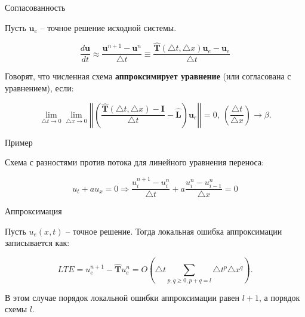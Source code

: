\documentclass[10pt,xcolor=pst,aspectratio=169]{beamer}
\begin{document}
\begin{frame}{Согласованность}

    \transdissolve[duration=0.1]
    \justifying
    \large

    Пусть $\textbf{u}_{e}$ -- точное решение исходной системы.

    \[
        \frac{d \textbf{u}}{d t} \approx \frac{\textbf{u}^{n + 1} - \textbf{u}^{n}}{\triangle t} \equiv \frac{\hat{\textbf{T}} (\triangle t, \triangle x) \textbf{u}_{e} - \textbf{u}_{e}}{\triangle t}
    \]

    Говорят, что численная схема \textbf{аппроксимирует уравнение} (или согласована с уравнением), если:

    \[
        \lim_{\triangle t \rightarrow 0} \lim_{\triangle x \rightarrow 0} \left| \left| \left( \frac{\hat{\textbf{T}} (\triangle t, \triangle x) - \textbf{I}}{\triangle t} - \hat{\textbf{L}} \right) \textbf{u}_{e} \right| \right| = 0, \: \left( \frac{\triangle t}{\triangle x} \right) \rightarrow \beta.
    \]


\end{frame}

\begin{frame}{Пример}

    \transdissolve[duration=0.1]
    \justifying
    \large

    Схема с разностями против потока для линейного уравнения переноса:

    \[
        u_{t} + a u_{x} = 0 \Rightarrow \frac{u^{n + 1}_{i} - u^{n}_{i}}{\triangle t} + a \frac{u^{n}_{i} - u^{n}_{i - 1}}{\triangle x} = 0
    \]

    

\end{frame}

\begin{frame}{Аппроксимация}

	\transdissolve[duration=0.1]
	\justifying
	\large

	Пусть $u_{e} (x, t)$ -- точное решение. Тогда локальная ошибка аппроксимации записывается как:

	\[
		LTE = u^{n + 1}_{e} - \hat{\textbf{T}} u^{n}_{e} = O \left( \triangle t \sum_{p , q \geq 0, p + q = l} \triangle t^{p} \triangle x^{q} \right).
	\]

	В этом случае порядок локальной ошибки аппроксимации равен $l + 1$, а порядок схемы $l$.

\end{frame}
\end{document}
